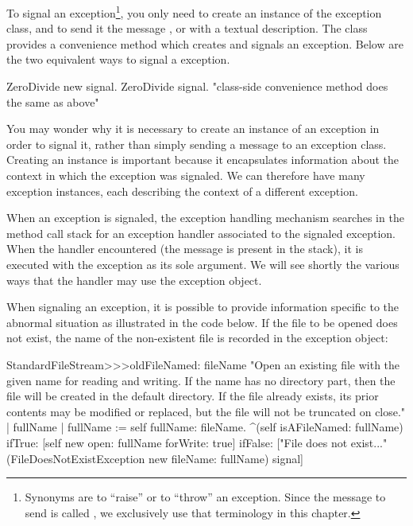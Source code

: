 \documentclass[a4paper,10pt,twoside]{book}
\begin{document}
To signal an exception\footnote{Synonyms are to ``raise'' or to ``throw'' an exception. Since the message to send is called , we exclusively use that terminology in this chapter.}, you only need to create an instance of the exception class, and to send it the message , or  with a textual description. The class  provides a convenience method  which creates and signals an exception. Below are the two equivalent ways to signal a  exception.
\begin{code}{}
	ZeroDivide new signal.
	ZeroDivide signal.    "class-side convenience method does the same as above"
\end{code}

You may wonder why it is necessary to create an instance of an exception in order to signal it, rather than simply sending a message to an exception class. Creating an instance is important because it encapsulates information about the context in which the exception was signaled. We can therefore have many exception instances, each describing the context of a different exception.

When an exception is signaled, the exception handling mechanism searches in the method call stack for an exception handler associated to the signaled exception. When the handler encountered (\ie the message  is present in the stack), it is executed with the exception as its sole argument. We will see shortly the various ways that the handler may use the exception object.

When signaling an exception, it is possible to provide information specific to the abnormal situation as illustrated in the code below. If the file to be opened does not exist, the name of the non-existent file is recorded in the exception object:

\begin{code}{}
StandardFileStream>>>oldFileNamed: fileName
	"Open an existing file with the given name for reading and writing. If the name has no directory part, then the file will be created in the default directory. If the file already exists, its prior contents may be modified or replaced, but the file will not be truncated on close."
	| fullName |
	fullName := self fullName: fileName.
	^(self isAFileNamed: fullName)
		ifTrue: [self new open: fullName forWrite: true]
		ifFalse: ["File does not exist..."
			(FileDoesNotExistException new fileName: fullName) signal]
\end{code}
\end{document}
